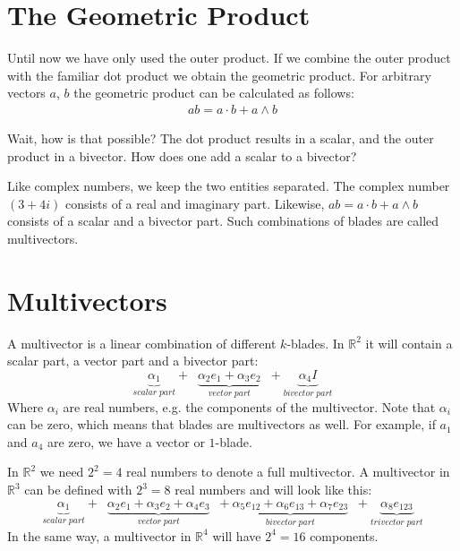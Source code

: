 \documentclass[10pt]{report}
\begin{document}
\section{The Geometric Product}
Until now we have only used the outer product. If we combine the
outer product with the familiar dot product we obtain the
geometric product. For arbitrary vectors $a$, $b$ the geometric
product can be calculated as follows:
\begin{eqnarray}
            ab = a\cdot b + a\wedge b
            \label{eq:geometric_product_vectors}
\end{eqnarray}

Wait, how is that possible? The dot product results in a scalar,
and the outer product in a bivector. How does one add a scalar to
a bivector?

Like complex numbers, we keep the two entities separated. The
complex number $(3 + 4i)$ consists of a real and imaginary part.
Likewise, $ab = a\cdot b + a\wedge b$ consists of a scalar and a
bivector part. Such combinations of blades are called
multivectors.

\section{Multivectors}
A multivector is a linear combination of different $k$-blades. In
$\mathbb{R}^2$ it will contain a scalar part, a vector part and a
bivector part:
\begin{displaymath}
    \underbrace{\alpha_1}_{scalar\;part} + \;\;\underbrace{\alpha_2 e_1 +\alpha_3 e_2}_{vector\;part}\;\; + \underbrace{\alpha_4 I}_{bivector\;part}
\end{displaymath}
Where $\alpha_i$ are real numbers, e.g. the components of the
multivector. Note that $\alpha_i$ can be zero, which means that
blades are multivectors as well. For example, if $a_{1}$ and
$a_{4}$ are zero, we have a vector or $1$-blade.

In $\mathbb{R}^2$ we need $2^2 = 4$ real numbers to denote a full
multivector. A multivector in $\mathbb{R}^3$ can be defined with
$2^3 = 8$ real numbers and will look like this:
\begin{displaymath}
    \underbrace{\alpha_1}_{scalar\;part} + \;\;
    \underbrace{\alpha_2 e_1 +\alpha_3 e_2 +\alpha_4 e_3}_{vector\;part}\;\; +
    \underbrace{\alpha_5 e_{12} +\alpha_6 e_{13} +\alpha_7 e_{23}}_{bivector\;part}\;\; +
    \underbrace{\alpha_8 e_{123}}_{trivector\;part}
\end{displaymath}
In the same way, a multivector in $\mathbb{R}^4$ will have $2^4 =
16$ components.
\end{document}

